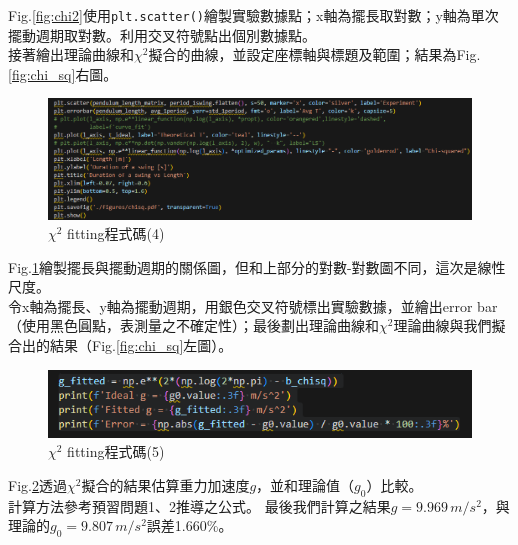 \documentclass[12pt,a4paper]{article}
\begin{document}
\begin{CJK}{UTF8}{bkai}
Fig.\ref{fig:chi2}使用\texttt{plt.scatter()}繪製實驗數據點；x軸為擺長取對數；y軸為單次擺動週期取對數。利用交叉符號點出個別數據點。\\
\indent 接著繪出理論曲線和$\chi^2$擬合的曲線，並設定座標軸與標題及範圍；結果為Fig.\ref{fig:chi_sq}右圖。


\begin{figure}[h]
    \centering
    \includegraphics[width=1\linewidth]{chi3.png}
    \caption{$\chi^2$ fitting程式碼(4)}
    \label{fig:chi3}
\end{figure}
\indent Fig.\ref{fig:chi3}繪製擺長與擺動週期的關係圖，但和上部分的對數-對數圖不同，這次是線性尺度。\\
\indent 令x軸為擺長、y軸為擺動週期，用銀色交叉符號標出實驗數據，並繪出error bar（使用黑色圓點，表測量之不確定性）；最後劃出理論曲線和$\chi^2$理論曲線與我們擬合出的結果（Fig.\ref{fig:chi_sq}左圖）。

\begin{figure}[h]
    \centering
    \includegraphics[width=1\linewidth]{chi4.png}
    \caption{$\chi^2$ fitting程式碼(5)}
    \label{fig:chi4}
\end{figure}

Fig.\ref{fig:chi4}透過$\chi^2$擬合的結果估算重力加速度$g$，並和理論值（$g_0$）比較。\\
\indent 計算方法參考預習問題1、2推導之公式。
最後我們計算之結果$g=9.969\,m/s^2$，與理論的$g_0=9.807\,m/s^2$誤差1.660\%。


\end{CJK}
\end{document}
